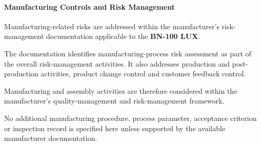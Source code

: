 
\paragraph{Manufacturing Controls and Risk Management}

Manufacturing-related risks are addressed within the manufacturer's
risk-management documentation applicable to the \textbf{BN-100 LUX}.

The documentation identifies manufacturing-process risk assessment
as part of the overall risk-management activities. It also
addresses production and post-production activities, product
change control and customer feedback control.

Manufacturing and assembly activities are therefore considered
within the manufacturer's quality-management and risk-management
framework.

No additional manufacturing procedure, process parameter,
acceptance criterion or inspection record is specified here
unless supported by the available manufacturer documentation.

